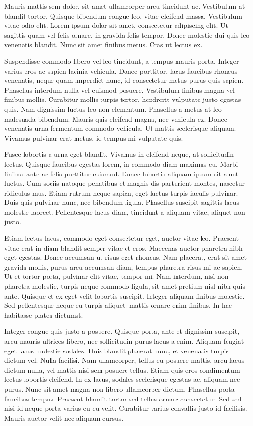 \documentclass[a4paper]{article}
\begin{document}
Mauris mattis sem dolor, sit amet ullamcorper arcu tincidunt ac. Vestibulum at blandit tortor. Quisque bibendum congue leo, vitae eleifend massa. Vestibulum vitae odio elit. Lorem ipsum dolor sit amet, consectetur adipiscing elit. Ut sagittis quam vel felis ornare, in gravida felis tempor. Donec molestie dui quis leo venenatis blandit. Nunc sit amet finibus metus. Cras ut lectus ex.

Suspendisse commodo libero vel leo tincidunt, a tempus mauris porta. Integer varius eros ac sapien lacinia vehicula. Donec porttitor, lacus faucibus rhoncus venenatis, neque quam imperdiet nunc, id consectetur metus purus quis sapien. Phasellus interdum nulla vel euismod posuere. Vestibulum finibus magna vel finibus mollis. Curabitur mollis turpis tortor, hendrerit vulputate justo egestas quis. Nam dignissim luctus leo non elementum. Phasellus a metus at leo malesuada bibendum. Mauris quis eleifend magna, nec vehicula ex. Donec venenatis urna fermentum commodo vehicula. Ut mattis scelerisque aliquam. Vivamus pulvinar erat metus, id tempus mi vulputate quis.

Fusce lobortis a urna eget blandit. Vivamus in eleifend neque, at sollicitudin lectus. Quisque faucibus egestas lorem, in commodo diam maximus eu. Morbi finibus ante ac felis porttitor euismod. Donec lobortis aliquam ipsum sit amet luctus. Cum sociis natoque penatibus et magnis dis parturient montes, nascetur ridiculus mus. Etiam rutrum neque sapien, eget luctus turpis iaculis pulvinar. Duis quis pulvinar nunc, nec bibendum ligula. Phasellus suscipit sagittis lacus molestie laoreet. Pellentesque lacus diam, tincidunt a aliquam vitae, aliquet non justo.

Etiam lectus lacus, commodo eget consectetur eget, auctor vitae leo. Praesent vitae erat in diam blandit semper vitae et eros. Maecenas auctor pharetra nibh eget egestas. Donec accumsan ut risus eget rhoncus. Nam placerat, erat sit amet gravida mollis, purus arcu accumsan diam, tempus pharetra risus mi ac sapien. Ut et tortor porta, pulvinar elit vitae, tempor mi. Nam interdum, nisl non pharetra molestie, turpis neque commodo ligula, sit amet pretium nisl nibh quis ante. Quisque et ex eget velit lobortis suscipit. Integer aliquam finibus molestie. Sed pellentesque neque eu turpis aliquet, mattis ornare enim finibus. In hac habitasse platea dictumst.

Integer congue quis justo a posuere. Quisque porta, ante et dignissim suscipit, arcu mauris ultrices libero, nec sollicitudin purus lacus a enim. Aliquam feugiat eget lacus molestie sodales. Duis blandit placerat nunc, et venenatis turpis dictum vel. Nulla facilisi. Nam ullamcorper, tellus eu posuere mattis, arcu lacus dictum nulla, vel mattis nisi sem posuere tellus. Etiam quis eros condimentum lectus lobortis eleifend. In ex lacus, sodales scelerisque egestas ac, aliquam nec purus. Nunc sit amet magna non libero ullamcorper dictum. Phasellus porta faucibus tempus. Praesent blandit tortor sed tellus ornare consectetur. Sed sed nisi id neque porta varius eu eu velit. Curabitur varius convallis justo id facilisis. Mauris auctor velit nec aliquam cursus.
\end{document}
